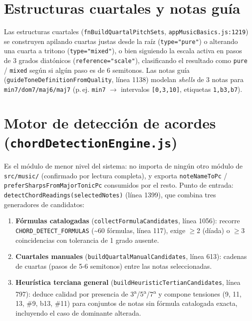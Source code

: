 \documentclass[a4paper,11pt,oneside]{report}
\begin{document}
\section{Estructuras cuartales y notas guía}
\label{sec:7.5}

Las estructuras cuartales (\lstinline!fnBuildQuartalPitchSets!, \lstinline!appMusicBasics.js:1219!) se construyen apilando cuartas justas desde la raíz (\lstinline!type="pure"!) o alterando una cuarta a tritono (\lstinline!type="mixed"!), o bien siguiendo la escala activa en pasos de 3 grados diatónicos (\lstinline!reference="scale"!), clasificando el resultado como \lstinline!pure! / \lstinline!mixed! según si algún paso es de 6 semitonos. Las notas guía (\lstinline!guideToneDefinitionFromQuality!, línea 1138) modelan \textit{shells} de 3 notas para \lstinline!min7/dom7/maj6/maj7! (p.\,ej. \lstinline!min7! $\to$ intervalos \lstinline![0,3,10]!, etiquetas \lstinline!1,b3,b7!).

\section{Motor de detección de acordes (\texttt{chordDetectionEngine.js})}
\label{sec:7.6}

Es el módulo de menor nivel del sistema: no importa de ningún otro módulo de \lstinline!src/music/! (confirmado por lectura completa), y exporta \lstinline!noteNameToPc! / \lstinline!preferSharpsFromMajorTonicPc! consumidos por el resto. Punto de entrada: \lstinline!detectChordReadings(selectedNotes)! (línea 1399), que combina tres generadores de candidatos:

\begingroup
\sloppy
\begin{enumerate}
\item \textbf{Fórmulas catalogadas} (\lstinline!collectFormulaCandidates!, línea 1056): recorre \lstinline!CHORD_DETECT_FORMULAS! (\textasciitilde60 fórmulas, línea 117), exige $\geq$2 (díada) o $\geq$3 coincidencias con tolerancia de 1 grado ausente.
\item \textbf{Cuartales manuales} (\lstinline!buildQuartalManualCandidates!, línea 613): cadenas de cuartas (pasos de 5-6 semitonos) entre las notas seleccionadas.
\item \textbf{Heurística terciana general} (\lstinline!buildHeuristicTertianCandidates!, línea 797): deduce calidad por presencia de 3\textsuperscript{a}/5\textsuperscript{a}/7\textsuperscript{a} y compone tensiones (9, 11, 13, \#9, b13, \#11) para conjuntos de notas sin fórmula catalogada exacta, incluyendo el caso de dominante alterada.
\end{enumerate}
\endgroup
\end{document}
